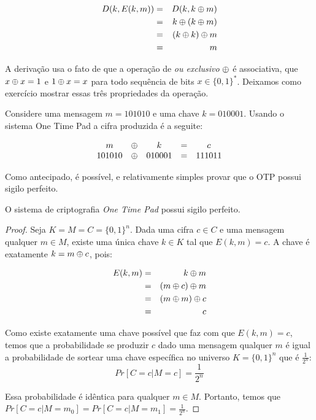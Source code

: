 \begin{eqnarray*}
  D(k, E(k, m)) & = & D(k, k \oplus m)\\
                & = & k \oplus (k \oplus m)\\
                & = & (k \oplus k) \oplus m\\
                & = & m
\end{eqnarray*}

A derivação usa o fato de que a operação de {\em ou exclusivo} $\oplus$ é associativa, que $x \oplus x = 1$ e $1 \oplus x = x$ para todo sequência de bits $x \in \{0,1\}^*$.
Deixamos como exercício mostrar essas três propriedades da operação.

\begin{example}
  Considere uma mensagem $m = 101010$ e uma chave $k = 010001$.
Usando o sistema One Time Pad a cifra produzida é a seguite:

\begin{displaymath}
  \begin{array}{ccccc}
    m & \oplus & k & = & c \\
    101010 & \oplus & 010001 & = & 111011
  \end{array}
\end{displaymath}
\end{example}

Como antecipado, é possível, e relativamente simples provar que o OTP possui sigilo perfeito.

\begin{theorem}
  O sistema de criptografia {\em One Time Pad} possui sigilo perfeito.
\end{theorem}

\begin{proof}
  Seja $K = M = C = \{0,1\}^n$.
  Dada uma cifra $c \in C$ e uma mensagem qualquer $m \in M$, existe uma única chave $k \in K$ tal que $E(k,m) = c$.
  A chave é exatamente $k = m \oplus c$, pois:
  
  \begin{eqnarray*}
    E(k, m) & = & k \oplus m \\
            & = & (m \oplus c) \oplus m\\
            & = & (m \oplus m) \oplus c\\
            & = & c
  \end{eqnarray*}

Como existe exatamente uma chave possível que faz com que $E(k,m) = c$, temos que a probabilidade se produzir $c$ dado uma mensagem qualquer $m$ é igual a probabilidade de sortear uma chave específica no universo $K = \{0,1\}^n$ que é $\frac{1}{2^n}$:
\begin{displaymath}
  Pr[C = c | M = c] = \frac{1}{2^n}
\end{displaymath}

Essa probabilidade é idêntica para qualquer $m \in M$.
Portanto, temos que $Pr[C = c| M = m_0] = Pr[C = c | M = m_1] = \frac{1}{2^n}$. 
\end{proof}

